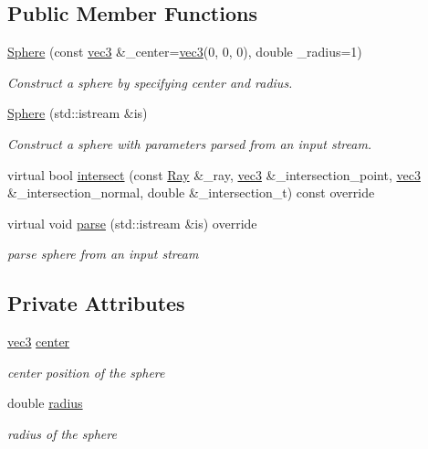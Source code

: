 \subsection*{Public Member Functions}
\begin{DoxyCompactItemize}
\item 
\hyperlink{classSphere_a65c44103cb8b65e624b89db0aa4831e1}{Sphere} (const \hyperlink{classvec3}{vec3} \&\+\_\+center=\hyperlink{classvec3}{vec3}(0, 0, 0), double \+\_\+radius=1)
\begin{DoxyCompactList}\small\item\em Construct a sphere by specifying center and radius. \end{DoxyCompactList}\item 
\hyperlink{classSphere_acb3e0c818334dfbbcb0557a37a38ee85}{Sphere} (std\+::istream \&is)
\begin{DoxyCompactList}\small\item\em Construct a sphere with parameters parsed from an input stream. \end{DoxyCompactList}\item 
virtual bool \hyperlink{classSphere_a6650f14281c43b799d9ae0c0b690b1bd}{intersect} (const \hyperlink{classRay}{Ray} \&\+\_\+ray, \hyperlink{classvec3}{vec3} \&\+\_\+intersection\+\_\+point, \hyperlink{classvec3}{vec3} \&\+\_\+intersection\+\_\+normal, double \&\+\_\+intersection\+\_\+t) const override
\item 
virtual void \hyperlink{classSphere_aa55e3407f148feb451866bc39907f6fb}{parse} (std\+::istream \&is) override
\begin{DoxyCompactList}\small\item\em parse sphere from an input stream \end{DoxyCompactList}\end{DoxyCompactItemize}
\subsection*{Private Attributes}
\begin{DoxyCompactItemize}
\item 
\hyperlink{classvec3}{vec3} \hyperlink{classSphere_a06c913d87d0f6d172b4049bbf18dadf9}{center}
\begin{DoxyCompactList}\small\item\em center position of the sphere \end{DoxyCompactList}\item 
double \hyperlink{classSphere_a45d6c6c870fac7c2a885ad2e226334ad}{radius}
\begin{DoxyCompactList}\small\item\em radius of the sphere \end{DoxyCompactList}\end{DoxyCompactItemize}
